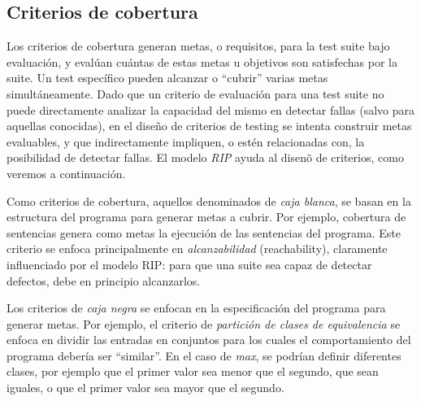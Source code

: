 \subsection{Criterios de cobertura}
\label{sec:preliminares.testing.covcriteria}


Los criterios de cobertura generan metas, o requisitos, para la test suite bajo evaluaci\'on, y eval\'uan cu\'antas de estas metas u objetivos son satisfechas por la suite. Un test espec\'ifico pueden alcanzar o ``cubrir'' varias metas simult\'aneamente. Dado que un criterio de evaluaci\'on para una test suite no puede directamente analizar la capacidad del mismo en detectar fallas (salvo para aquellas conocidas), en el dise\~no de criterios de testing se intenta construir metas evaluables, y que indirectamente impliquen, o est\'en relacionadas con, la posibilidad de detectar fallas. El modelo \emph{RIP} ayuda al disen\~o de criterios, como veremos a continuaci\'on.

Como criterios de cobertura, aquellos denominados de \emph{caja blanca}, se basan en la estructura del programa para generar metas a cubrir. Por ejemplo, cobertura de sentencias genera como metas la ejecuci\'on de las sentencias del programa. Este criterio se enfoca principalmente en \emph{alcanzabilidad} (reachability), claramente influenciado por el modelo RIP: para que una suite sea capaz de detectar defectos, debe en principio alcanzarlos. 

Los criterios de \emph{caja negra} se enfocan en la especificaci\'on del programa para generar metas. Por ejemplo, el criterio de \emph{partici\'on de clases de equivalencia} se enfoca en dividir las entradas en conjuntos para los cuales el comportamiento del programa deber\'ia ser ``similar''. En el caso de \emph{max}, se podr\'ian definir diferentes clases, por ejemplo que el primer valor sea menor que el segundo, que sean iguales, o que el primer valor sea mayor que el segundo. 
